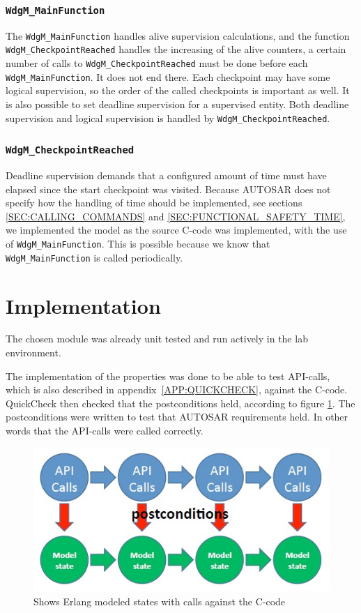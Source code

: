 \subsubsection{\lstinline!WdgM_MainFunction!}
The \lstinline!WdgM_MainFunction! handles alive supervision
calculations, and the function \lstinline!WdgM_CheckpointReached!
handles the increasing of the alive counters, a certain number of
calls to \lstinline!WdgM_CheckpointReached! must be done before each
\lstinline!WdgM_MainFunction!. It does not end there. Each checkpoint
may have some logical supervision, so the order of the called
checkpoints is important as well. It is also possible to set deadline
supervision for a supervised entity. Both deadline supervision and
logical supervision is handled by \lstinline!WdgM_CheckpointReached!.

\subsubsection{\lstinline!WdgM_CheckpointReached!}
Deadline supervision demands that a configured amount of time must
have elapsed since the start checkpoint was visited. Because AUTOSAR
does not specify how the handling of time should be implemented, see
sections \ref{SEC:CALLING_COMMANDS} and
\ref{SEC:FUNCTIONAL_SAFETY_TIME}, we implemented the model as the
source C-code was implemented, with the use of
\lstinline!WdgM_MainFunction!. This is possible because we know that
\lstinline!WdgM_MainFunction! is called periodically.


\section{Implementation}
The chosen module was already unit tested and run actively
in the lab environment.

The implementation of the properties was done to be able to test
API-calls, which is also described in appendix~\ref{APP:QUICKCHECK}, against
the C-code. QuickCheck then checked that the postconditions held,
according to figure \ref{FIG:api_calls}. The postconditions were
written to test that AUTOSAR requirements held. In other words that
the API-calls were called correctly.

\begin{figure}[!ht]
  \begin{center}
    \includegraphics{pictures/api_calls.jpg}
  \end{center}
  \caption{Shows Erlang modeled states with calls against the C-code}
  \label{FIG:api_calls}
\end{figure}

